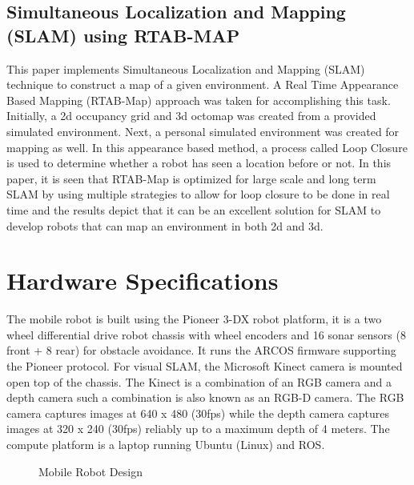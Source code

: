 \documentclass[conference, letterpaper]{IEEEtran}
\begin{document}
\subsection{Simultaneous Localization and Mapping (SLAM) using RTAB-MAP}
This paper implements Simultaneous Localization and Mapping (SLAM) technique to construct a map of a given environment. A Real Time Appearance Based Mapping (RTAB-Map) approach was taken for accomplishing this task. Initially, a 2d occupancy grid and 3d octomap was created from a provided simulated environment. Next, a personal simulated environment was created for mapping as well. In this appearance based method, a process called Loop Closure is used to determine whether a robot has seen a location before or not. In this paper, it is seen that RTAB-Map is optimized for large scale and long term SLAM by using multiple strategies to allow for loop closure to be done in real time and the results depict that it can be an excellent solution for SLAM to develop robots that can map an environment in both 2d and 3d. 

\section{Hardware Specifications}
The mobile robot is built using the Pioneer 3-DX robot platform, it is a two 
wheel differential drive robot chassis with wheel encoders and 16 sonar sensors 
(8 front + 8 rear) for obstacle avoidance. It runs the ARCOS firmware supporting
the Pioneer protocol. For visual SLAM, the Microsoft Kinect camera is mounted open
top of the chassis. The Kinect is a combination of an RGB camera and a depth 
camera such a combination is also known as an RGB-D camera. The RGB camera 
captures images at 640 x 480 (30fps) while the depth camera captures images at 
320 x 240 (30fps) reliably up to a maximum depth of 4 meters. The compute 
platform is a laptop running Ubuntu (Linux) and ROS.

\begin{figure}[h]
  \centering
  \caption{Mobile Robot Design}
\end{figure}
\end{document}
